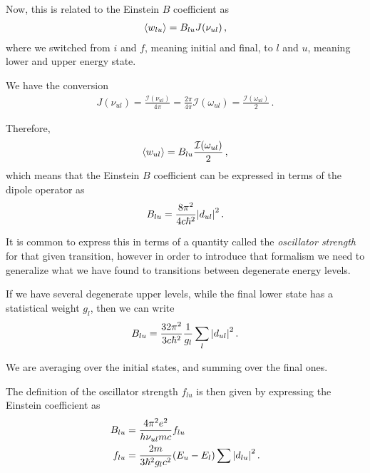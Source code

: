 \documentclass[main.tex]{subfiles}
\begin{document}
Now, this is related to the Einstein \(B\) coefficient as 
%
\begin{align}
\expval{w_{lu}} = B_{lu} J(\nu _{ul})
\,,
\end{align}
%
where we switched from \(i\) and \(f\), meaning initial and final, to \(l\) and \(u\), meaning lower and upper energy state. 

We have the conversion 
%
\begin{align}
J(\nu _{ul}) = \frac{\mathcal{I}(\nu _{ul})}{4 \pi }
= \frac{2 \pi }{4 \pi } \mathcal{I}(\omega _{ul})
= \frac{\mathcal{I}(\omega _{ul})}{2}
\,.
\end{align}


Therefore, 
%
\begin{align}
\expval{w_{ul}} = B_{lu} \frac{\mathcal{I}(\omega _{ul})}{2}
\,,
\end{align}
%
which means that the Einstein \(B\) coefficient can be expressed in terms of the dipole operator as 
%
\begin{align}
B_{lu} = \frac{8 \pi^2}{4 c \hbar^2} \abs{d_{ul}}^2
\,.
\end{align}

It is common to express this in terms of a quantity called the \emph{oscillator strength} for that given transition, however in order to introduce that formalism we need to generalize what we have found to transitions between degenerate energy levels. 

If we have several degenerate upper levels, while the final lower state has a statistical weight \(g_l\), then we can write 
%
\begin{align}
B_{lu} = \frac{32 \pi^2}{3 c \hbar^2} \frac{1}{g_l} \sum _{l} \abs{d_{ul}}^2
\,.
\end{align}

We are averaging over the initial states, and summing over the final ones.




The definition of the oscillator strength \(f_{lu}\) is then given by expressing the Einstein coefficient as 
%
\begin{align}
B_{lu} &= \frac{4 \pi^2 e^2}{h \nu_{ul} m c} f_{lu}  \\
f_{lu} &= \frac{2 m }{3 \hbar^2 g_l c^2} (E_u - E_l) \sum \abs{d_{lu}}^2  
\,.
\end{align}
\end{document}
